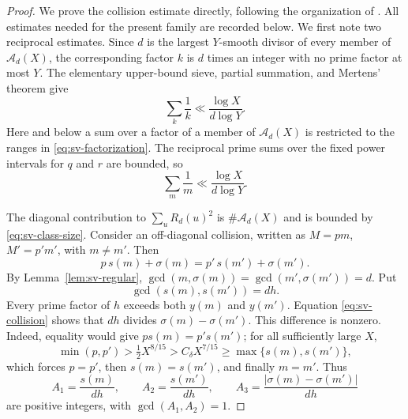 \documentclass[11pt]{article}
\theoremstyle{remark}
\newcommand{\1}{\mathbf 1}
\begin{document}
\begin{proof}
We prove the collision estimate directly, following the organization of
\cite[(3.4), \S\S3.1--3.2]{LucaPomerance}.  All estimates needed for the
present family are recorded below.  We first note two reciprocal estimates.  Since $d$ is the largest $Y$-smooth divisor of every
member of $\mathcal A_d(X)$, the corresponding factor $k$ is $d$ times an
integer with no prime factor at most $Y$.  The elementary upper-bound sieve,
partial summation, and Mertens' theorem give
\begin{equation}\label{eq:sv-k-reciprocal}
 \sum_{k}\frac1k\ll\frac{\log X}{d\log Y}.
\end{equation}
Here and below a sum over a factor of a member of $\mathcal A_d(X)$ is
restricted to the ranges in \eqref{eq:sv-factorization}.  The reciprocal
prime sums over the fixed power intervals for $q$ and $r$ are bounded, so
\begin{equation}\label{eq:sv-m-reciprocal}
 \sum_m\frac1m\ll\frac{\log X}{d\log Y}.
\end{equation}

The diagonal contribution to $\sum_uR_d(u)^2$ is
$\#\mathcal A_d(X)$ and is bounded by \eqref{eq:sv-class-size}.  Consider
an off-diagonal collision, written as $M=pm$, $M'=p'm'$, with $m\ne m'$.
Then
\begin{equation}\label{eq:sv-collision}
 p\,s(m)+\sigma(m)=p'\,s(m')+\sigma(m').
\end{equation}
By Lemma~\ref{lem:sv-regular},
$\gcd(m,\sigma(m))=\gcd(m',\sigma(m'))=d$.  Put
\[
 \gcd(s(m),s(m'))=dh.
\]
Every prime factor of $h$ exceeds both $y(m)$ and $y(m')$.  Equation
\eqref{eq:sv-collision} shows that $dh$ divides
$\sigma(m)-\sigma(m')$.  This difference is nonzero.  Indeed, equality
would give $p s(m)=p's(m')$; for all sufficiently large $X$,
\[
 \min(p,p')>\tfrac12X^{8/15}>C_\delta X^{7/15}
 \geq\max\{s(m),s(m')\},
\]
which forces $p=p'$, then $s(m)=s(m')$, and finally $m=m'$.  Thus
\[
 A_1=\frac{s(m)}{dh},\qquad
 A_2=\frac{s(m')}{dh},\qquad
 A_3=\frac{|\sigma(m)-\sigma(m')|}{dh}
\]
are positive integers, with $\gcd(A_1,A_2)=1$.


\end{proof}
\end{document}
